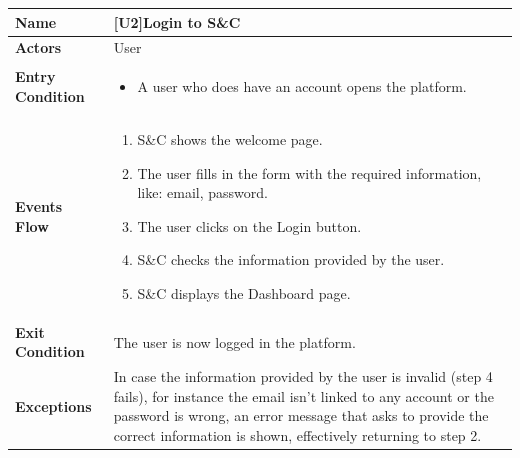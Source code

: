 \begin{center}
    \begin{tabular}{|p{9em}|p{27em}|}
        \hline
        \rowcolor{bluepoli!40}
        \textbf{Name} & \textbf{[U2]Login to S\&C} \\
        \hline
        \textbf{Actors} & User \\
        \hline
        \textbf{Entry Condition} & 
        \begin{itemize}
            \item A user who does have an account opens the platform.
        \end{itemize} \\
        \hline
        \textbf{Events Flow} & 
        \begin{enumerate}
            \item S\&C shows the welcome page.
            \item The user fills in the form with the required information, like: email, password.
            \item The user clicks on the Login button.
            \item S\&C checks the information provided by the user.
            \item S\&C displays the Dashboard page. 
        \end{enumerate} \\
        \hline
        \textbf{Exit Condition} & The user is now logged in the platform. \\
        \hline
        \textbf{Exceptions} & In case the information provided by the user is invalid (step 4 fails), for instance the email isn't linked to
        any account or the password is wrong, an error message that asks to provide the correct information is shown, effectively 
        returning to step 2. \\
        \hline
    \end{tabular}
\end{center}

